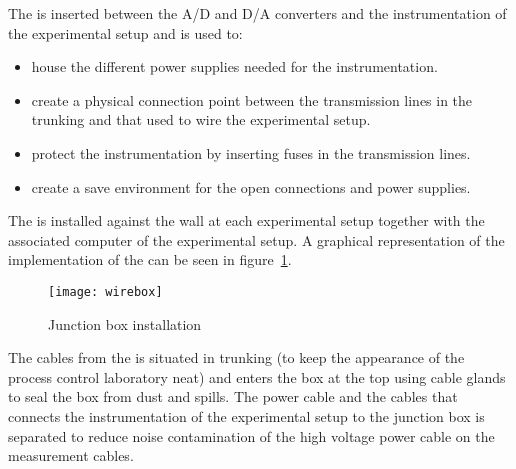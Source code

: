 The  is inserted between the A/D and D/A converters and the instrumentation of the experimental setup and is used to:
\begin{itemize} 
	\item house the different power supplies needed for the instrumentation.
	\item create a physical connection point between the transmission lines in the trunking and that used to wire 				the experimental setup. 
	\item protect the instrumentation by inserting fuses in the transmission lines.
	\item create a save environment for the open connections and power supplies. 
\end{itemize}
The  is installed against the wall at each experimental setup together with the associated computer of the experimental setup. A graphical representation of the implementation of the  can be seen in figure~\ref{fig:wire:box}.
\begin{figure}[htbp]
	\centering
	\texttt{[image: wirebox]}
	\caption{Junction box installation}
	\label{fig:wire:box}
\end{figure}

The cables from the  is situated in trunking (to keep the appearance of the process control laboratory neat) and enters the box at the top using cable glands to seal the box from dust and spills. The power cable and the cables that connects the instrumentation of the experimental setup to the junction box is separated to reduce noise contamination of the high voltage power cable on the measurement cables.

